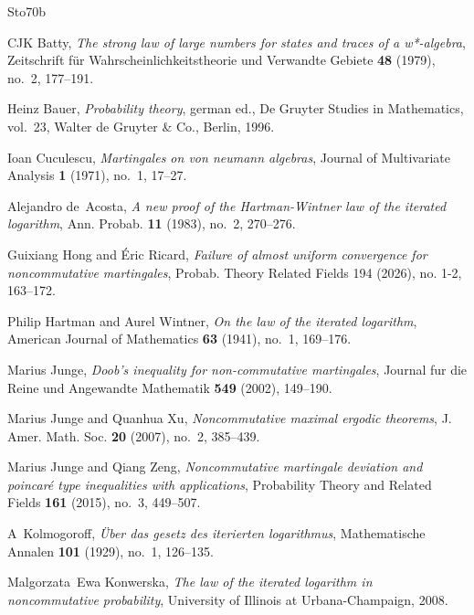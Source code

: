 \documentclass[10pt]{amsart}
\theoremstyle{definition}
\theoremstyle{myremark}
\numberwithin{equation}{section}
\begin{document}
\begin{thebibliography}{Sto70b}

CJK Batty, \emph{The strong law of large numbers for states and traces of a w*-algebra}, Zeitschrift f{\"u}r Wahrscheinlichkeitstheorie und Verwandte Gebiete \textbf{48} (1979), no.~2, 177--191.

Heinz Bauer, \emph{Probability theory}, german ed., De Gruyter Studies in Mathematics, vol.~23, Walter de Gruyter \& Co., Berlin, 1996. 

Ioan Cuculescu, \emph{Martingales on von neumann algebras}, Journal of Multivariate Analysis \textbf{1} (1971), no.~1, 17--27.

Alejandro de~Acosta, \emph{A new proof of the {H}artman-{W}intner law of the iterated logarithm}, Ann. Probab. \textbf{11} (1983), no.~2, 270--276. 

Guixiang Hong and {\'E}ric Ricard, \emph{Failure of almost uniform convergence for noncommutative martingales},  Probab. Theory Related Fields 194 (2026), no. 1-2, 163–172.

Philip Hartman and Aurel Wintner, \emph{On the law of the iterated logarithm}, American Journal of Mathematics \textbf{63} (1941), no.~1, 169--176.

Marius Junge, \emph{Doob's inequality for non-commutative martingales}, Journal fur die Reine und Angewandte Mathematik \textbf{549} (2002), 149--190.

Marius Junge and Quanhua Xu, \emph{Noncommutative maximal ergodic theorems}, J. Amer. Math. Soc. \textbf{20} (2007), no.~2, 385--439. 

Marius Junge and Qiang Zeng, \emph{Noncommutative martingale deviation and poincar{\'e} type inequalities with applications}, Probability Theory and Related Fields \textbf{161} (2015), no.~3, 449--507.

A~Kolmogoroff, \emph{{\"U}ber das gesetz des iterierten logarithmus}, Mathematische Annalen \textbf{101} (1929), no.~1, 126--135.

Malgorzata~Ewa Konwerska, \emph{The law of the iterated logarithm in noncommutative probability}, University of Illinois at Urbana-Champaign, 2008.


\end{thebibliography}
\end{document}
